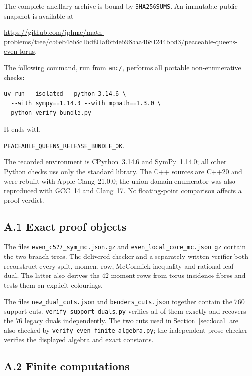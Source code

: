 \documentclass[11pt]{amsart}
\theoremstyle{definition}
\theoremstyle{remark}
\newcommand{\bs}{\discretionary{}{}{}}
\begin{document}
The complete ancillary archive is bound by \texttt{SHA256SUMS}.  An immutable
public snapshot is available at
\begin{center}
\url{https://github.com/jphme/math-problems/tree/c55eb4858c15df01af6ffde5985aa4681244bbd3/peaceable-queens-even-torus}.
\end{center}
The following command, run from \texttt{anc/}, performs all portable
non-enumerative checks:
\begin{verbatim}
uv run --isolated --python 3.14.6 \
  --with sympy==1.14.0 --with mpmath==1.3.0 \
  python verify_bundle.py
\end{verbatim}
It ends with
\begin{center}
\texttt{PEACEABLE\_\bs{}QUEENS\_\bs{}RELEASE\_\bs{}BUNDLE\_\bs{}OK}.
\end{center}
The recorded environment is CPython~3.14.6 and SymPy~1.14.0; all other
Python checks use only the standard library.  The C++ sources are C++20 and
were rebuilt with Apple Clang~21.0.0; the union-domain enumerator was also
reproduced with GCC~14 and Clang~17.  No floating-point comparison affects a
proof verdict.

\subsection*{A.1 Exact proof objects}

The files \texttt{even\_\bs{}c527\_\bs{}sym\_\bs{}mc.json.gz} and
\texttt{even\_\bs{}local\_\bs{}core\_\bs{}mc.json.gz} contain the two branch
trees.  The delivered checker and a separately written verifier both
reconstruct every split, moment row, McCormick inequality and rational leaf
dual.  The latter also derives the $42$ moment rows from torus incidence
fibres and tests them on explicit colourings.

The files \texttt{new\_\bs{}dual\_\bs{}cuts.json} and
\texttt{benders\_\bs{}cuts.json} together contain the $760$ support cuts.
\texttt{verify\_\bs{}support\_\bs{}duals.py} verifies all of them exactly and
recovers the $76$ legacy duals independently.  The two cuts used in
Section~\ref{sec:local} are also checked by
\texttt{verify\_\bs{}even\_\bs{}finite\_\bs{}algebra.py}; the independent
prose checker verifies the displayed algebra and exact constants.

\subsection*{A.2 Finite computations}
\end{document}
